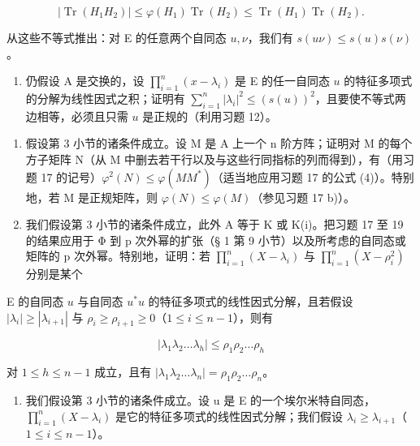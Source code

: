 \[
\left| \operatorname{Tr} (H _ {1} H _ {2}) \right| \leqslant \varphi (H _ {1}) \operatorname{Tr} (H _ {2}) \leqslant \operatorname{Tr} (H _ {1}) \operatorname{Tr} (H _ {2}).
\]

  从这些不等式推出：对 E 的任意两个自同态 \(u, \nu\)，我们有 \(s(u\nu) \leqslant s(u)s(\nu)\)。

\begin{enumerate}
\def\labelenumi{\alph{enumi})}
\setcounter{enumi}{2}
\tightlist
\item
  仍假设 A 是交换的，设 \(\prod_{i=1}^{n}(x-\lambda_i)\) 是 E 的任一自同态 \(u\) 的特征多项式的分解为线性因式之积；证明有 \(\sum_{i=1}^{n}|\lambda_i|^2\leqslant(s(u))^2\)，且要使不等式两边相等，必须且只需 \(u\) 是正规的（利用习题 12）。
\end{enumerate}

\begin{enumerate}
\def\labelenumi{\arabic{enumi})}
\setcounter{enumi}{18}
\item
  假设第 3 小节的诸条件成立。设 M 是 A 上一个 n 阶方阵；证明对 M 的每个方子矩阵 N（从 M 中删去若干行以及与这些行同指标的列而得到），有（用习题 17 的记号）\(\varphi^{2}(N) \leqslant \varphi(MM^{*})\)（适当地应用习题 17 的公式 (4)）。特别地，若 M 是正规矩阵，则 \(\varphi(N) \leqslant \varphi(M)\)（参见习题 17 b)）。
\item
  我们假设第 3 小节的诸条件成立，此外 A 等于 K 或 K(i)。把习题 17 至 19 的结果应用于 Φ 到 p 次外幂的扩张（§ 1 第 9 小节）以及所考虑的自同态或矩阵的 p 次外幂。特别地，证明：若 \(\prod_{i=1}^{n}(X-\lambda_i)\) 与 \(\prod_{i=1}^{n}(X-\rho_i^2)\) 分别是某个
\end{enumerate}

E 的自同态 \(u\) 与自同态 \(u^*u\) 的特征多项式的线性因式分解，且若假设 \(|\lambda_i| \geqslant |\lambda_{i+1}|\) 与 \(\rho_i \geqslant \rho_{i+1} \geqslant 0\)（\(1 \leqslant i \leqslant n-1\)），则有

\[
\mid \lambda_ {1} \lambda_ {2} \dots \lambda_ {h} \mid \leqslant \rho_ {1} \rho_ {2} \dots \rho_ {h}
\]

对 \(1 \leqslant h \leqslant n - 1\) 成立，且有 \(|\lambda_1\lambda_2 \ldots \lambda_n| = \rho_1\rho_2 \ldots \rho_n\)。

\begin{enumerate}
\def\labelenumi{\arabic{enumi})}
\setcounter{enumi}{20}
\tightlist
\item
  我们假设第 3 小节的诸条件成立。设 u 是 E 的一个埃尔米特自同态，\(\prod_{i=1}^{n}(X-\lambda_{i})\) 是它的特征多项式的线性因式分解；我们假设 \(\lambda_{i}\geqslant\lambda_{i+1}\)（\(1\leqslant i\leqslant n-1\)）。
\end{enumerate}

